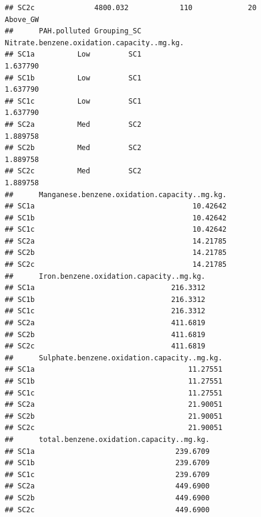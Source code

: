 \documentclass[
]{article}
\begin{document}
\begin{verbatim}
## SC2c              4800.032            110             20    Above_GW
##      PAH.polluted Grouping_SC Nitrate.benzene.oxidation.capacity..mg.kg.
## SC1a          Low         SC1                                   1.637790
## SC1b          Low         SC1                                   1.637790
## SC1c          Low         SC1                                   1.637790
## SC2a          Med         SC2                                   1.889758
## SC2b          Med         SC2                                   1.889758
## SC2c          Med         SC2                                   1.889758
##      Manganese.benzene.oxidation.capacity..mg.kg.
## SC1a                                     10.42642
## SC1b                                     10.42642
## SC1c                                     10.42642
## SC2a                                     14.21785
## SC2b                                     14.21785
## SC2c                                     14.21785
##      Iron.benzene.oxidation.capacity..mg.kg.
## SC1a                                216.3312
## SC1b                                216.3312
## SC1c                                216.3312
## SC2a                                411.6819
## SC2b                                411.6819
## SC2c                                411.6819
##      Sulphate.benzene.oxidation.capacity..mg.kg.
## SC1a                                    11.27551
## SC1b                                    11.27551
## SC1c                                    11.27551
## SC2a                                    21.90051
## SC2b                                    21.90051
## SC2c                                    21.90051
##      total.benzene.oxidation.capacity..mg.kg.
## SC1a                                 239.6709
## SC1b                                 239.6709
## SC1c                                 239.6709
## SC2a                                 449.6900
## SC2b                                 449.6900
## SC2c                                 449.6900
\end{verbatim}
\end{document}
